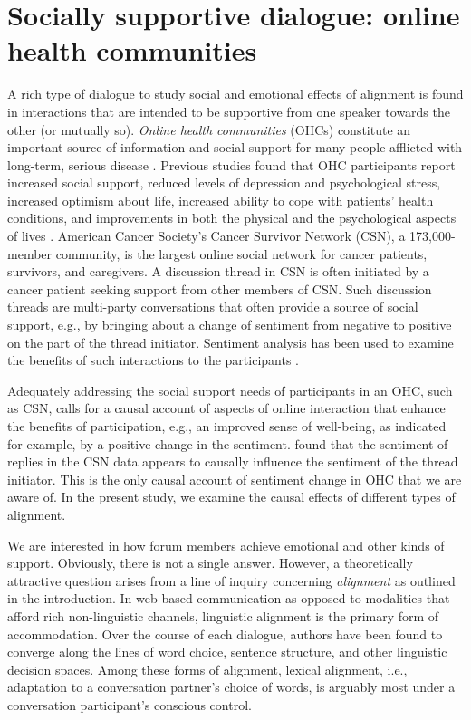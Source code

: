 \documentclass[man,biblatex,floatsintext]{apa6}
\begin{document}
\section{Socially supportive dialogue: online health communities}

A rich type of dialogue to study social and emotional effects of alignment is found in interactions that are intended to be supportive from one speaker towards the other (or mutually so).
\emph{Online health communities} (OHCs) constitute an important source of information and social support for many people afflicted with long-term, serious disease \parencite{dunkel1984social}. Previous studies found that OHC participants report increased social support, reduced levels of depression and psychological stress, increased optimism about life\parencite{rodgers2005internet}, increased ability to cope with patients' health conditions, and improvements in both the physical and the psychological aspects of lives \parencite{dunkel1984social,rodgers2005internet, maloney2005multilevel,beaudoin2008modeling,bouma2015internet}. American Cancer Society's Cancer Survivor Network (CSN), a 173,000-member community, is the largest online social network for cancer patients, survivors, and caregivers. A discussion thread in CSN is often initiated by a cancer patient seeking support from other members of CSN. Such discussion threads are multi-party conversations that often provide a source of social support, e.g., by bringing about a change of sentiment from negative to positive on the part of the thread initiator. Sentiment analysis has been used to examine the benefits of such interactions to the participants \parencite{qiu2011get,huh2013text,portier2013understanding}. 

Adequately addressing the social support needs of participants in an OHC, such as CSN, calls for a causal account of aspects of online interaction that enhance the benefits of participation, e.g., an improved sense of well-being, as indicated for example, by a positive change in the sentiment. \citeauthor{bui2016temporal} found that the sentiment of replies in the CSN data appears to causally influence the sentiment of the thread initiator.  This is the only causal account of sentiment change in OHC that we are aware of.
In the present study, we examine the causal effects of different types of alignment.

We are interested in how forum members achieve emotional and other kinds of support.  Obviously, there is not a single answer.  However, a theoretically attractive question arises from a line of inquiry concerning \emph{alignment} as outlined in the introduction.  In web-based communication as opposed to modalities that afford rich non-linguistic channels,  linguistic alignment is the primary form of accommodation. Over the course of each dialogue, authors have been found to converge along the lines of word choice, sentence structure, and other linguistic decision spaces. Among these forms of alignment, lexical alignment, i.e., adaptation to a conversation partner's choice of words, is arguably most under a conversation participant's conscious control. 
\end{document}
